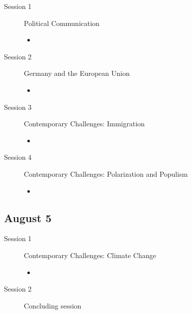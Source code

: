 \documentclass[12p,a4]{article}
\begin{document}
\begin{description}
\item[Session 1] {Political Communication}
                \begin{itemize}
				     \item \citet[Chapter 8]{grotz2023political} 
				\end{itemize}
				
\item[Session 2] {Germany and the European Union}				
				
				\begin{itemize}
                   \item \citet[Chapter 3]{grotz2023political} 
				\end{itemize}
				
\item[Session 3] {Contemporary Challenges: Immigration}
				
\begin{itemize}
    \item \citet{hager2019attitudes}
\end{itemize}				
				
 \item[Session 4] {Contemporary Challenges: Polarization and Populism}
				
\begin{itemize}
\item \citet{Arzheimer2015}
\end{itemize}				

\end{description}                

				
\subsection*{August 5}				
\begin{description}
    \item[Session 1]{Contemporary Challenges: Climate Change} 
	\begin{itemize}
	    \item \citet{McCright03032016}
	\end{itemize}
 \item[Session 2] {Concluding session}				
\end{description}				
				



\end{document}

